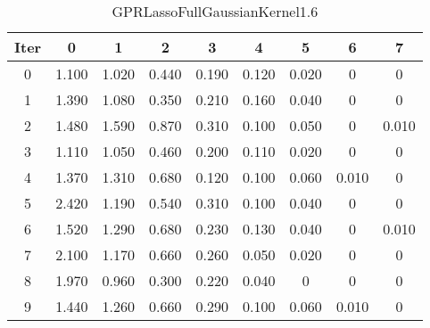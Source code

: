 \begin{table}
	\begin{center}
		\begin{tabular}{|c|c|c|c|c|c|c|c|c|}
			\hline
			Iter & 0 & 1 & 2 & 3 & 4 & 5 & 6 & 7 \\
			\hline
			0 & 1.100 & 1.020 & 0.440 & 0.190 & 0.120 & 0.020 & 0 & 0 \\
			\hline
			1 & 1.390 & 1.080 & 0.350 & 0.210 & 0.160 & 0.040 & 0 & 0 \\
			\hline
			2 & 1.480 & 1.590 & 0.870 & 0.310 & 0.100 & 0.050 & 0 & 0.010 \\
			\hline
			3 & 1.110 & 1.050 & 0.460 & 0.200 & 0.110 & 0.020 & 0 & 0 \\
			\hline
			4 & 1.370 & 1.310 & 0.680 & 0.120 & 0.100 & 0.060 & 0.010 & 0 \\
			\hline
			5 & 2.420 & 1.190 & 0.540 & 0.310 & 0.100 & 0.040 & 0 & 0 \\
			\hline
			6 & 1.520 & 1.290 & 0.680 & 0.230 & 0.130 & 0.040 & 0 & 0.010 \\
			\hline
			7 & 2.100 & 1.170 & 0.660 & 0.260 & 0.050 & 0.020 & 0 & 0 \\
			\hline
			8 & 1.970 & 0.960 & 0.300 & 0.220 & 0.040 & 0 & 0 & 0 \\
			\hline
			9 & 1.440 & 1.260 & 0.660 & 0.290 & 0.100 & 0.060 & 0.010 & 0 \\
			\hline
		\end{tabular}
	\end{center}
	\caption{GPRLassoFullGaussianKernel1.6}
\end{table}
